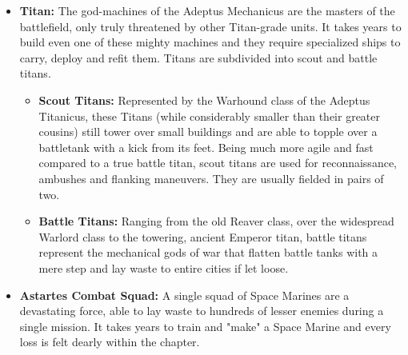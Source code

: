 \begin{itemize}
    \item \textbf{Titan:} The god-machines of the Adeptus Mechanicus are the masters of the battlefield, only truly threatened by other Titan-grade units. It takes years to build even one of these mighty machines and they require specialized ships to carry, deploy and refit them. Titans are subdivided into scout and battle titans.
    \begin{itemize}
        \item \textbf{Scout Titans:} Represented by the Warhound class of the Adeptus Titanicus, these Titans (while considerably smaller than their greater cousins) still tower over small buildings and are able to topple over a battletank with a kick from its feet. Being much more agile and fast compared to a true battle titan, scout titans are used for reconnaissance, ambushes and flanking maneuvers. They are usually fielded in pairs of two.
        \item \textbf{Battle Titans:} Ranging from the old Reaver class, over the widespread Warlord class to the towering, ancient Emperor titan, battle titans represent the mechanical gods of war that flatten battle tanks with a mere step and lay waste to entire cities if let loose.
    \end{itemize}
    \item \textbf{Astartes Combat Squad:} A single squad of Space Marines are a devastating force, able to lay waste to hundreds of lesser enemies during a single mission. It takes years to train and "make" a Space Marine and every loss is felt dearly within the chapter.
\end{itemize}

